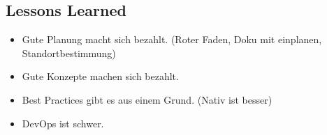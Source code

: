 \subsection{Lessons Learned}

\begin{itemize}
    \item Gute Planung macht sich bezahlt. (Roter Faden, Doku mit einplanen, Standortbestimmung)
    \item Gute Konzepte machen sich bezahlt.
    \item Best Practices gibt es aus einem Grund. (Nativ ist besser)
    \item DevOps ist schwer.
\end{itemize}
